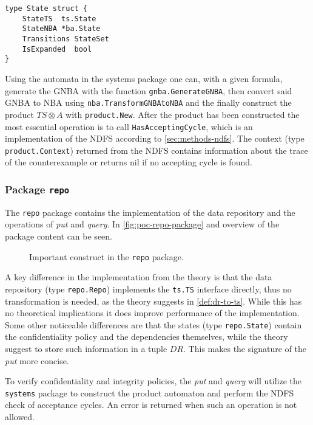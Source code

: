 \begin{lstlisting}[language=Golang, caption={Definition of \texttt{product.State}.}, label={lst:product-state}, floatplacement=H]
type State struct {
    StateTS  ts.State
    StateNBA *ba.State
    Transitions StateSet
    IsExpanded  bool
}
\end{lstlisting}

Using the automata in the systems package one can, with a given formula, generate the GNBA with the function \verb=gnba.GenerateGNBA=, then convert said GNBA to NBA using \verb=nba.TransformGNBAtoNBA= and the finally construct the product $TS\otimes A$ with \verb=product.New=. After the product has been constructed the most essential operation is to call \verb=HasAcceptingCycle=, which is an implementation of the NDFS according to \autoref{sec:methods-ndfs}. The context (type \verb=product.Context=) returned from the NDFS contains information about the trace of the counterexample or returns nil if no accepting cycle is found.

\subsubsection{Package \texttt{repo}}
The \verb=repo= package contains the implementation of the data repository and the operations of \emph{put} and \emph{query}. In \autoref{fig:poc-repo-package} and overview of the package content can be seen.
\begin{figure}
    \caption{Important construct in the \texttt{repo} package.}
    \label{fig:poc-repo-package}
\end{figure}
A key difference in the implementation from the theory is that the data repository (type \verb=repo.Repo=) implements the \verb=ts.TS= interface directly, thus no transformation is needed, as the theory suggests in \autoref{def:dr-to-ts}. While this has no theoretical implications it does improve performance of the implementation. Some other noticeable differences are that the states (type \verb=repo.State=) contain the confidentiality policy and the dependencies themselves, while the theory suggest to store such information in a tuple $DR$. This makes the signature of the \emph{put} more concise.

To verify confidentiality and integrity policies, the \emph{put} and \emph{query} will utilize the \verb=systems= package to construct the product automaton and perform the NDFS check of acceptance cycles. An error is returned when such an operation is not allowed.
